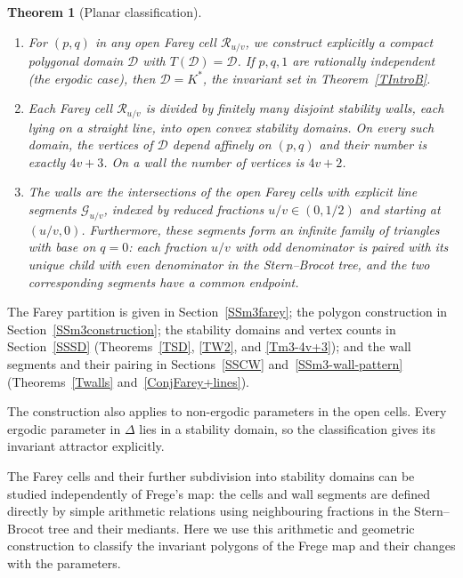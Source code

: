 \documentclass[11pt,reqno,tbtags,a4paper]{amsart}
\numberwithin{equation}{section}
\theoremstyle{plain}%
\newtheorem{fregeintrotheorem}{Theorem}
\theoremstyle{definition}
\theoremstyle{remark}
\newenvironment{romenumerate}[1][-10pt]{%
\addtolength{\leftmargini}{#1}\begin{enumerate}%
 \renewcommand{\labelenumi}{\textup{(\roman{enumi})}}%
 \renewcommand{\theenumi}{\labelenumi}%
%
 }{\end{enumerate}}
\newcommand{\refT}[1]{Theorem~\ref{#1}}
\newcommand{\refSS}[1]{Section~\ref{#1}}
\newcommand\cD{\mathcal D}
\newcommand\LG{{\mathcal G}} %
\newcommand\cR{{\mathcal R}}
\newcommand\Kx{K^*}
\newcommand\uv{_{u/v}}
\newcommand\0{{\boldsymbol 0}}
\newcommand\1{{\boldsymbol 1}}
\begin{document}
\begin{fregeintrotheorem}[Planar classification]\label{TIntroC}
\begin{romenumerate}
\item
For $(p,q)$ in any open Farey cell $\cR_{u/v}$, we construct explicitly
a compact polygonal domain $\cD$ with $T(\cD)=\cD$.
If\/ $p,q,1$ are rationally independent (the ergodic case), then $\cD=\Kx$,
the invariant set in \refT{TIntroB}.
\item
Each Farey cell $\cR\uv$ is divided by finitely many disjoint
\emph{stability walls}, each lying on a straight line, into
open convex \emph{stability domains}. On every such domain, the vertices of
$\cD$ depend affinely on $(p,q)$ and their number is exactly $4v+3$.
On a wall the number of vertices is $4v+2$.
\item
The walls are the intersections of the open Farey cells with
explicit line segments $\LG_{u/v}$, indexed by reduced fractions
$u/v\in(0,1/2)$ and starting at $(u/v,0)$.
Furthermore, these segments form an infinite family of triangles with base on
$q=0$:
each fraction $u/v$ with odd denominator is
paired with its unique child with even denominator in the Stern--Brocot
tree, and the two corresponding segments have a common endpoint.
\end{romenumerate}
\end{fregeintrotheorem}

The Farey partition is given in \refSS{SSm3farey};
the polygon construction in \refSS{SSm3construction};
the stability domains and vertex counts in
\refSS{SSSD} (Theorems~\ref{TSD}, \ref{TW2}, and \ref{Tm3-4v+3});
and the wall segments and their pairing in
Sections~\ref{SSCW} and~\ref{SSm3-wall-pattern}
(Theorems~\ref{Twalls} and~\ref{ConjFarey+lines}).

The construction also applies to non-ergodic parameters in the open
cells. Every ergodic parameter in $\Delta$ lies in a stability domain,
so the classification gives its invariant attractor explicitly.

The Farey cells and their further subdivision into stability domains
can be studied independently of Frege's map:
the cells and wall segments are defined directly
by simple arithmetic relations using neighbouring
fractions in the Stern--Brocot tree
and their mediants.
Here we use this arithmetic and geometric
construction to classify the invariant polygons of the Frege map and
their changes with the parameters.
\end{document}
